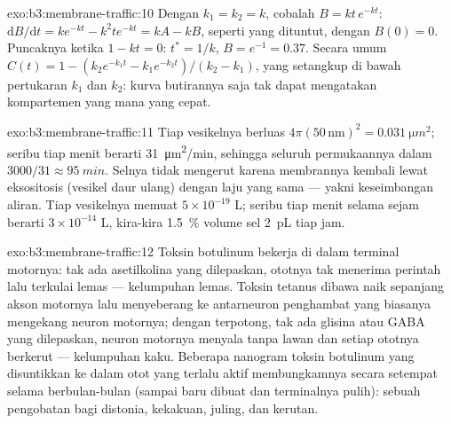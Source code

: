 \begin{solution}{exo:b3:membrane-traffic:10}
Dengan $k_{1} = k_{2} = k$, cobalah $B = kt\,e^{-kt}$: $\mathrm{d}B/\mathrm{d}t
= k e^{-kt} - k^{2}t e^{-kt} = kA - kB$, seperti yang dituntut, dengan $B(0) = 0$.
Puncaknya ketika $1 - kt = 0$: $t^{*} = 1/k$, $B = e^{-1} = 0.37$. Secara umum
$C(t) = 1 - (k_{2}e^{-k_{1}t} - k_{1}e^{-k_{2}t})/(k_{2} - k_{1})$,
yang setangkup di bawah pertukaran $k_{1}$ dan $k_{2}$: kurva butirannya
saja tak dapat mengatakan kompartemen yang mana yang cepat.
\end{solution}

\begin{solution}{exo:b3:membrane-traffic:11}
Tiap vesikelnya berluas $4\pi(50\,\text{nm})^{2} = \qty{0.031}{\micro
m^2}$; seribu tiap menit berarti \qty{31}{\micro m^2/min}, sehingga seluruh
permukaannya dalam $3000/31 \approx \qty{95}{min}$. Selnya tidak mengerut
karena membrannya kembali lewat eksositosis (vesikel daur ulang) dengan laju
yang sama --- yakni keseimbangan aliran. Tiap vesikelnya memuat $5\times 10^{-19}$ L;
seribu tiap menit selama sejam berarti $3\times 10^{-14}$ L, kira-kira
\qty{1.5}{\%} volume sel \qty{2}{pL} tiap jam.
\end{solution}

\begin{solution}{exo:b3:membrane-traffic:12}
Toksin botulinum bekerja di dalam terminal motornya: tak ada asetilkolina yang
dilepaskan, ototnya tak menerima perintah lalu terkulai lemas --- kelumpuhan
lemas. Toksin tetanus dibawa naik sepanjang akson motornya lalu menyeberang ke
antarneuron penghambat yang biasanya mengekang neuron motornya; dengan
 terpotong, tak ada glisina atau GABA yang dilepaskan, neuron motornya
menyala tanpa lawan dan setiap ototnya berkerut --- kelumpuhan kaku. Beberapa
nanogram toksin botulinum yang disuntikkan ke dalam otot yang terlalu aktif
membungkamnya secara setempat selama berbulan-bulan (sampai  baru dibuat
dan terminalnya pulih): sebuah pengobatan bagi distonia, kekakuan, juling, dan kerutan.
\end{solution}


